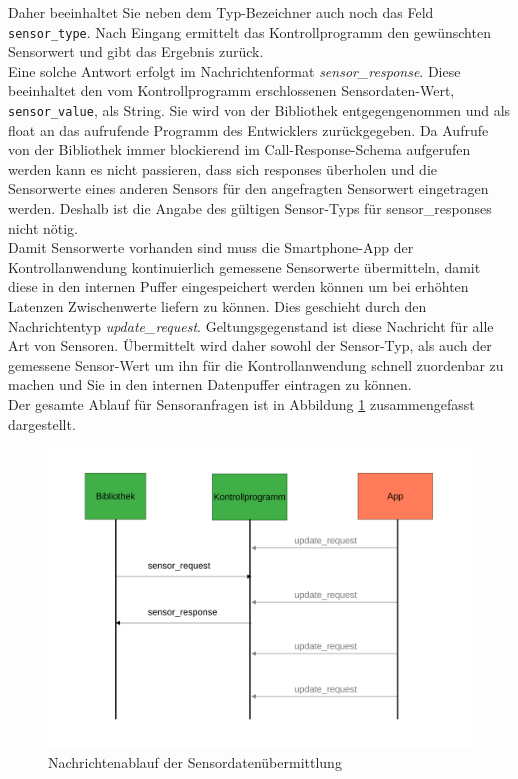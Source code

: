 \documentclass[11pt,a4paper]{report}
\begin{document}
Daher beeinhaltet Sie neben dem Typ-Bezeichner auch noch das Feld \texttt{sensor\_type}.
Nach Eingang ermittelt das Kontrollprogramm den gewünschten Sensorwert und gibt das Ergebnis zurück.
\\
Eine solche Antwort erfolgt im Nachrichtenformat \textit{sensor\_response}.
Diese beeinhaltet den vom Kontrollprogramm erschlossenen Sensordaten-Wert, \texttt{sensor\_value}, als String.
Sie wird von der Bibliothek entgegengenommen und als float an das aufrufende Programm des Entwicklers zurückgegeben.
Da Aufrufe von der Bibliothek immer blockierend im Call-Response-Schema aufgerufen werden kann es nicht passieren, dass sich responses überholen und die Sensorwerte eines anderen Sensors für den angefragten Sensorwert eingetragen werden.
Deshalb ist die Angabe des gültigen Sensor-Typs für sensor\_responses nicht nötig.
\\
Damit Sensorwerte vorhanden sind muss die Smartphone-App der Kontrollanwendung kontinuierlich gemessene Sensorwerte übermitteln, damit diese in den internen Puffer eingespeichert werden können um bei erhöhten Latenzen Zwischenwerte liefern zu können.
Dies geschieht durch den Nachrichtentyp \textit{update\_request}.
Geltungsgegenstand ist diese Nachricht für alle Art von Sensoren.
Übermittelt wird daher sowohl der Sensor-Typ, als auch der gemessene Sensor-Wert um ihn für die Kontrollanwendung schnell zuordenbar zu machen und Sie in den internen Datenpuffer eintragen zu können.
\\
Der gesamte Ablauf für Sensoranfragen ist in Abbildung \ref{fig:message_flow_requests} zusammengefasst dargestellt.
\begin{figure}[htbp]
\centering
\includegraphics[width=.9\textwidth]{images/message_flow_sensor.pdf}
\caption{Nachrichtenablauf der Sensordatenübermittlung}
\label{fig:message_flow_requests}
\end{figure}
\end{document}
